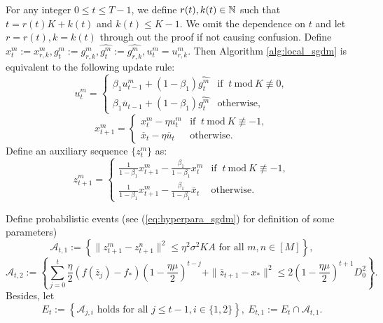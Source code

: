 \documentclass{article} %
\numberwithin{equation}{section}
\renewcommand{\eqref}[1]{(\ref{#1})}
\begin{document}
    For any integer $0\leq t\leq T-1$, we define $r(t),k(t)\in\mathbb{N}$ such that $t=r(t)K+k(t)$ and $k(t)\leq K-1$. We omit the dependence on $t$ and let $r=r(t),k=k(t)$ through out the proof if not causing confusion. Define $x_t^m:=x_{r,k}^m, g_t^m:=g_{r,k}^m, \widehat{g_t^m}:=\widehat{g_{r,k}^m}, u_t^m=u_{r,k}^m$. Then Algorithm \ref{alg:local_sgdm} is equivalent to the following update rule:
    \begin{equation}
        u_t^m = \left\{
        \begin{array}{ll}
            \beta_1u_{t-1}^m + (1-\beta_1)\widehat{g_t^m} & \text{if $\ t\ \text{mod}\ K \not\equiv 0$}, \\
            \beta_1\overline{u}_{t-1} + (1-\beta_1)\widehat{g_t^m} & \text{otherwise}, 
        \end{array}
        \right.
    \end{equation}
    \begin{equation}
        x_{t+1}^m = \left\{
        \begin{array}{ll}
            x_t^m-\eta u_t^m & \text{if $\ t\ \text{mod}\ K \not\equiv -1$}, \\
            \overline{x}_t-\eta\overline{u}_t & \text{otherwise}.
        \end{array}
        \right.
    \end{equation}
    Define an auxiliary sequence $\{z_t^m\}$ as:
    \begin{equation}
        z_{t+1}^m = \left\{
        \begin{array}{ll}
            \frac{1}{1-\beta_1}x_{t+1}^m-\frac{\beta_1}{1-\beta_1}x_t^m & \text{if $\ t\ \text{mod}\ K \not\equiv -1$}, \\
            \frac{1}{1-\beta_1}x_{t+1}^m-\frac{\beta_1}{1-\beta_1}\overline{x}_t & \text{otherwise}.
        \end{array}
        \right.
    \end{equation}
    
    Define probabilistic events (see \eqref{eq:hyperpara_sgdm} for definition of some parameters)
    \begin{equation}
        \mathcal{A}_{t,1}:=\left\{ \|z_{t+1}^m-z_{t+1}^n\|^2 \leq \eta^2\sigma^2KA \text{ for all } m,n\in [M] \right\},
    \end{equation}
    \begin{equation}
        \mathcal{A}_{t,2}:=\left\{ \sum_{j=0}^t\frac{\eta}{2}(f(\overline{z}_j)-f_*)(1-\frac{\eta\mu}{2})^{t-j}+\|\overline{z}_{t+1}-x_*\|^2
        \leq 2(1-\frac{\eta\mu}{2})^{t+1}D_0^2\right\}.
    \end{equation}
    Besides, let 
    \begin{equation}
        E_t:= \left\{\mathcal{A}_{j,i} \text{ holds for all }j\leq t-1, i\in\{1,2\} \right\},\ E_{t,1} := E_t \cap \mathcal{A}_{t,1}.
    \end{equation}
\end{document}
